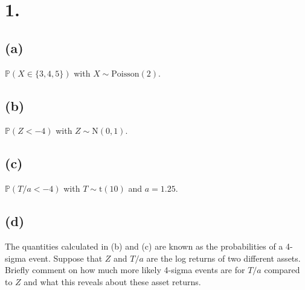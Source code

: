 \documentclass{article}
\begin{document}
\thispagestyle{firstpageheader}

\section*{1.}
{\Large 

%

\subsection*{(a)}

$\mathbb{P}(X \in \{3, 4, 5\})$ with $X \sim \text{Poisson}(2)$.

\subsection*{(b)}

$\mathbb{P}(Z < -4)$ with $Z \sim \text{N}(0, 1)$.

\subsection*{(c)}

$\mathbb{P}(T / a < -4)$ with $T \sim \text{t}(10)$ and $a = 1.25$.

\subsection*{(d)}

The quantities calculated in (b) and (c) are known as the probabilities of a 4-sigma event. Suppose that $Z$ and $T/a$ are the log returns of two different assets. Briefly comment on how much more likely 4-sigma events are for $T/a$ compared to $Z$ and what this reveals about these asset returns.

}
\end{document}
